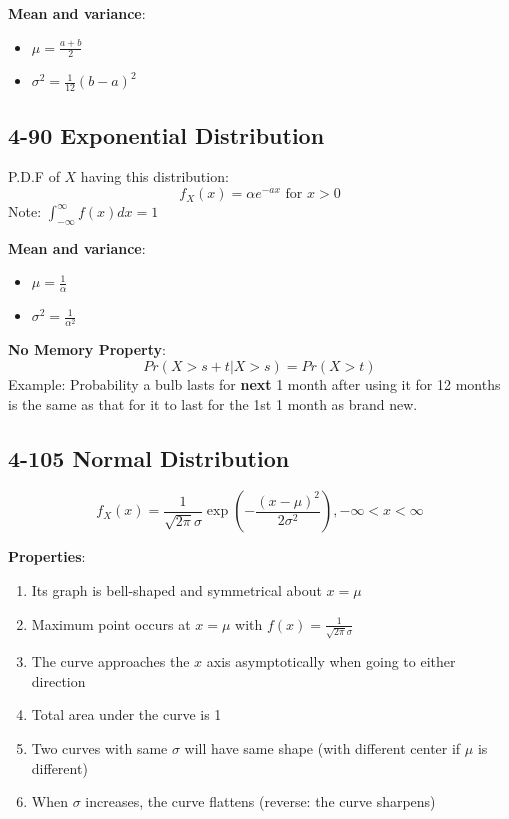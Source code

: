\documentclass[12pt,landscape]{article}
\begin{document}
\begin{multicols}{3}
    \textbf{Mean and variance}:
    \begin{itemize}
        \item $\mu = \frac{a+b}{2}$
        \item $\sigma^2 = \frac{1}{12}(b-a)^2$
    \end{itemize}

    \subsection{4-90 Exponential Distribution}
    P.D.F of $X$ having this distribution:
        $$ f_X(x) = \alpha e^{-ax} \text{ for } x > 0 $$
    Note: $\int_{-\infty}^{\infty} f(x)dx = 1$

    \textbf{Mean and variance}:
    \begin{itemize}
        \item $\mu = \frac{1}{\alpha}$
        \item $\sigma^2 = \frac{1}{\alpha^2}$
    \end{itemize}

    \textbf{No Memory Property}:
        $$ Pr(X > s + t | X > s) = Pr(X > t) $$
    Example: Probability a bulb lasts for \textbf{next} 1 month after using it for 12 months is the
    same as that for it to last for the 1st 1 month as brand new.

    \subsection{4-105 Normal Distribution}
        $$ f_X(x) = \frac{1}{\sqrt{2\pi}\sigma} \exp(-\frac{(x-\mu)^2}{2\sigma^2}), -\infty < x < \infty $$
    
    \textbf{Properties}:
    \begin{enumerate}
        \item Its graph is bell-shaped and symmetrical about $x = \mu$
        \item Maximum point occurs at $x = \mu$ with $f(x) = \frac{1}{\sqrt{2\pi}\sigma}$
        \item The curve approaches the $x$ axis asymptotically when going to either direction
        \item Total area under the curve is 1
        \item Two curves with same $\sigma$ will have same shape (with different center if $\mu$ is different)
        \item When $\sigma$ increases, the curve flattens (reverse: the curve sharpens)
    \end{enumerate}


\end{multicols}
\end{document}
